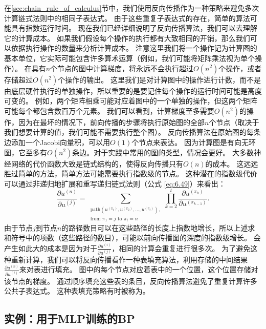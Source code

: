 在\ref{sec:chain_rule_of_calculus}节中，我们使用反向传播作为一种策略来避免多次计算链式法则中的相同子表达式。
由于这些重复子表达式的存在，简单的算法可能具有指数运行时间。
现在我们已经详细说明了反向传播算法，我们可以去理解它的计算成本。
如果我们假设每个操作的执行都有大致相同的开销，那么我们可以依据执行操作的数量来分析计算成本。
注意这里我们将一个操作记为计算图的基本单位，它实际可能包含许多算术运算（例如，我们可能将矩阵乘法视为单个操作）。
在具有$n$个节点的图中计算梯度，将永远不会执行超过$O(n^2)$个操作，或者存储超过$O(n^2)$个操作的输出。
这里我们是对计算图中的操作进行计数，而不是由底层硬件执行的单独操作，所以重要的是要记住每个操作的运行时间可能是高度可变的。
例如，两个矩阵相乘可能对应着图中的一个单独的操作，但这两个矩阵可能每个都包含数百万个元素。
我们可以看到，计算梯度至多需要$O(n^2)$的操作，因为在最坏的情况下，前向传播的步骤将执行原始图的全部$n$个节点（取决于我们想要计算的值，我们可能不需要执行整个图）。
反向传播算法在原始图的每条边添加一个Jacobi向量积，可以用$O(1)$个节点来表达。
因为计算图是有向无环图，它至多有$O(n^2)$条边。对于实践中常用的图的类型，情况会更好。
大多数神经网络的代价函数大致是链式结构的，使得反向传播只有$O(n)$的成本。
这远远胜过简单的方法，简单方法可能需要执行指数级的节点。
这种潜在的指数级代价可以通过非递归地扩展和重写递归链式法则（公式
\ref{eq:6.49}）来看出：
\begin{equation}
  \frac{\partial u^{(n)}}{\partial u^{(j)}} =
  \sum_{\substack{\text{path}(u^{(\pi_1)}, u^{(\pi_2)}, \ldots, u^{(\pi_t)}  ),\\ \text{from } \pi_1=j \text{ to }\pi_t = n}}
  \prod_{k=2}^t \frac{\partial u^{(\pi_k)}}{\partial u^{(\pi_{k-1})}}.
\end{equation}
由于节点$j$到节点$n$的路径数目可以在这些路径的长度上指数地增长，所以上述求和符号中的项数（这些路径的数目），可能以前向传播图的深度的指数级增长。
会产生如此大的成本是因为对于$\frac{\partial u^{(i)}}{\partial u^{(j)}}$，相同的计算会重复进行很多次。
为了避免这种重新计算，我们可以将反向传播看作一种表填充算法，利用存储的中间结果$\frac{\partial u^{(n)}}{\partial u^{(i)}}$来对表进行填充。
图中的每个节点对应着表中的一个位置，这个位置存储对该节点的梯度。
通过顺序填充这些表的条目，反向传播算法避免了重复计算许多公共子表达式。
这种表填充策略有时被称为。
  
  
\subsection{实例：用于MLP训练的BP}
\label{sec:example_back_propagation_for_mlp_training}

